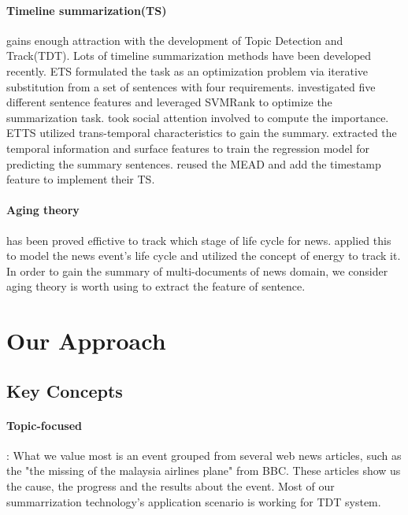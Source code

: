 \documentclass{llncs}
\begin{document}
\paragraph{Timeline summarization(TS)} gains enough attraction with the development of Topic Detection and Track(TDT). Lots of timeline summarization methods have been developed recently. ETS \cite{2011-Yan-p745-754} formulated the task as an optimization  problem via iterative substitution from a set of sentences with four requirements. \cite{tran2013leveraging} investigated five different sentence features and leveraged SVMRank to optimize the summarization task. \cite{zhao2013timeline} took social attention involved to compute the importance. ETTS \cite{Yan-2011-TGT-2145432-2145483} utilized trans-temporal characteristics to gain the summary. \cite{binh2013structured} extracted the temporal information and surface features to train the regression model for predicting the summary sentences. \cite{2008-Nedunchelian-p480-485} reused the MEAD and add the timestamp feature to implement their TS.
 
\paragraph{Aging theory} has been proved effictive to track which stage of life cycle for news. \cite{2007-Chen-p1016-1025} \cite{chen2003life} applied this to model the news event's life cycle and utilized the concept of energy to track it. In order to gain the summary of multi-documents of news domain, we consider aging theory is worth using to extract the feature of sentence.

%
\section{Our Approach}
%

\subsection{Key Concepts}
\paragraph{Topic-focused}: What we value most is an event grouped from several web news articles, such as the "the missing of the malaysia airlines plane" from BBC. These articles show us the cause, the progress and the results about the event. Most of our summarrization technology's application scenario is working for TDT system. 
\end{document}
